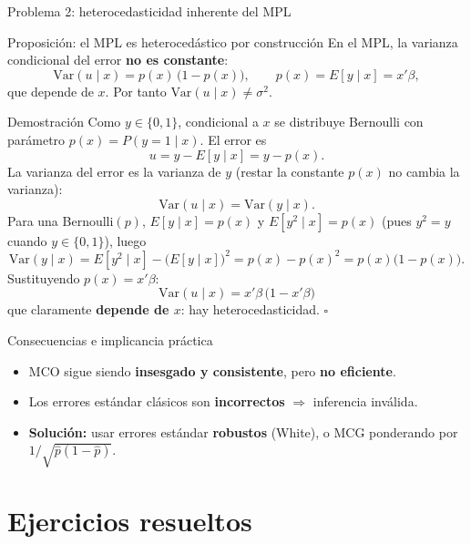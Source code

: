 \documentclass{beamer}
\begin{document}
\begin{frame}[allowframebreaks]{Problema 2: heterocedasticidad inherente del MPL}

\begin{alertblock}{Proposición: el MPL es heterocedástico por construcción}
En el MPL, la varianza condicional del error \textbf{no es constante}:
\[
\text{Var}(u\mid x) = p(x)\,\bigl(1-p(x)\bigr),\qquad p(x)=E[y\mid x]=x'\beta,
\]
que depende de $x$. Por tanto $\text{Var}(u\mid x)\neq\sigma^2$.
\end{alertblock}

\framebreak

\begin{exampleblock}{Demostración}
Como $y\in\{0,1\}$, condicional a $x$ se distribuye Bernoulli con parámetro $p(x)=P(y=1\mid x)$. El error es
\[
u = y - E[y\mid x] = y - p(x).
\]
\pause
La varianza del error es la varianza de $y$ (restar la constante $p(x)$ no cambia la varianza):
\[
\text{Var}(u\mid x) = \text{Var}(y\mid x).
\]
\pause
Para una Bernoulli$(p)$, $E[y\mid x]=p(x)$ y $E[y^2\mid x]=p(x)$ (pues $y^2=y$ cuando $y\in\{0,1\}$), luego
\[
\text{Var}(y\mid x) = E[y^2\mid x]-\bigl(E[y\mid x]\bigr)^2 = p(x) - p(x)^2 = p(x)\bigl(1-p(x)\bigr).
\]
\pause
Sustituyendo $p(x)=x'\beta$:
\[
\boxed{\;\text{Var}(u\mid x) = x'\beta\,\bigl(1-x'\beta\bigr)\;}
\]
que claramente \textbf{depende de $x$}: hay heterocedasticidad. \hfill$\square$
\end{exampleblock}

\framebreak

\begin{block}{Consecuencias e implicancia práctica}
\begin{itemize}
    \item MCO sigue siendo \textbf{insesgado y consistente}, pero \textbf{no eficiente}.
    \item Los errores estándar clásicos son \textbf{incorrectos} $\Rightarrow$ inferencia inválida.
    \item \textbf{Solución:} usar errores estándar \textbf{robustos} (White), o MCG ponderando por $1/\sqrt{\hat p(1-\hat p)}$.
\end{itemize}
\end{block}

\end{frame}

\section{Ejercicios resueltos}
\end{document}
